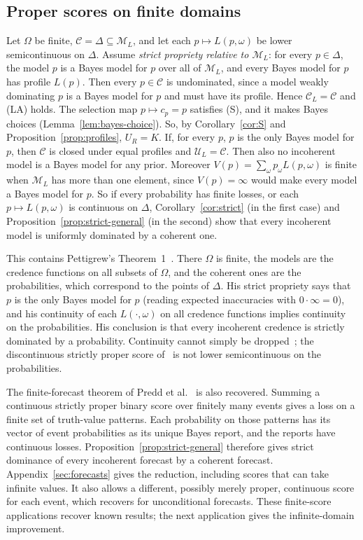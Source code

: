 \documentclass[11pt]{article}
\theoremstyle{definition}
\theoremstyle{remark}
\newcommand{\M}{\mathcal M}
\newcommand{\C}{\mathcal C}
\newcommand{\U}{\mathcal U}
\begin{document}
\subsection{Proper scores on finite domains}\label{sec:proper}
Let $\Omega$ be finite, $\C=\Delta\subseteq\M_L$, and let each $p\mapsto L(p,\omega)$ be lower semicontinuous on $\Delta$. Assume \emph{strict propriety relative to $\M_L$}: for every $p\in\Delta$, the model $p$ is a Bayes model for $p$ over all of $\M_L$, and every Bayes model for $p$ has profile $L(p)$. Then every $p\in\C$ is undominated, since a model weakly dominating $p$ is a Bayes model for $p$ and must have its profile. Hence $\C_L=\C$ and (LA) holds. The selection map $p\mapsto c_p=p$ satisfies (S), and it makes Bayes choices (Lemma~\ref{lem:bayes-choice}). So, by Corollary~\ref{cor:S} and Proposition~\ref{prop:profiles}, $U_R=K$. If, for every $p$, $p$ is the only Bayes model for $p$, then $\C$ is closed under equal profiles and $\U_L=\C$. Then also no incoherent model is a Bayes model for any prior. Moreover $V(p)=\sum_\omega p_\omega L(p,\omega)$ is finite when $\M_L$ has more than one element, since $V(p)=\infty$ would make every model a Bayes model for $p$. So if every probability has finite losses, or each $p\mapsto L(p,\omega)$ is continuous on $\Delta$, Corollary~\ref{cor:strict} (in the first case) and Proposition~\ref{prop:strict-general} (in the second) show that every incoherent model is uniformly dominated by a coherent one.

This contains Pettigrew's Theorem~1~\cite{Pettigrew}. There $\Omega$ is finite, the models are the credence functions on all subsets of $\Omega$, and the coherent ones are the probabilities, which correspond to the points of $\Delta$. His strict propriety says that $p$ is the only Bayes model for $p$ (reading expected inaccuracies with $0\cdot\infty=0$), and his continuity of each $L(\cdot,\omega)$ on all credence functions implies continuity on the probabilities. His conclusion is that every incoherent credence is strictly dominated by a probability. Continuity cannot simply be dropped~\cite{SSK09}; the discontinuous strictly proper score of~\cite[Example~4]{SSK09} is not lower semicontinuous on the probabilities.

The finite-forecast theorem of Predd et al.~\cite[Theorem~1]{Predd} is also recovered. Summing a continuous strictly proper binary score over finitely many events gives a loss on a finite set of truth-value patterns. Each probability on those patterns has its vector of event probabilities as its unique Bayes report, and the reports have continuous losses. Proposition~\ref{prop:strict-general} therefore gives strict dominance of every incoherent forecast by a coherent forecast. Appendix~\ref{sec:forecasts} gives the reduction, including scores that can take infinite values. It also allows a different, possibly merely proper, continuous score for each event, which recovers \cite[Theorem~2, Conclusion~3]{SSK09} for unconditional forecasts. These finite-score applications recover known results; the next application gives the infinite-domain improvement.
\end{document}

